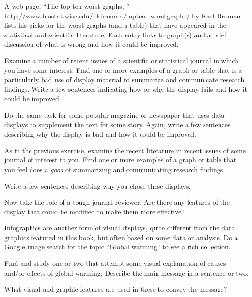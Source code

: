 
\begin{Exercises}

 \exercise A web page, ``The top ten worst graphs, '' \url{http://www.biostat.wisc.edu/~kbroman/topten_worstgraphs/} by Karl Broman lists his picks for the worst graphs (and a table) that have appeared in the
 statistical and scientific literature.  Each entry links to graph(s) and a brief discussion of
 what is wrong and how it could be improved. 
 \begin{enumerate*}
   \item Examine a number of recent issues of a scientific or statistical journal in which you
   have some interest.  Find one or more examples of a graph or table that is a particularly
   bad use of display material to summarize and communicate research findings. Write a
   few sentences indicating how or why the display fails and how it could be improved.
   \item Do the same task for some popular magazine or newspaper that uses data displays
   to supplement the text for some story. Again, write a few sentences describing why the
   display is bad and how it could be improved.
 \end{enumerate*}
 
 \exercise As in the previous exercise, examine the recent literature in recent issues of some
 journal of interest to you.  Find one or more examples of a graph or table that you feel
 does a \emph{good} of summarizing and communicating research findings.
 \begin{enumerate*}
   \item Write a few sentences describing why you chose these displays.
   \item Now take the role of a tough journal reviewer.  Are there any features of the
   display that could be modified to make them more effective?
 \end{enumerate*}
 
 \exercise Infographics are another form of visual displays, quite different from the
 data graphics featured in this book, but often based on some data or analysis.
 Do a Google image search for the topic ``Global warming'' to see a rich
 collection.
 \begin{enumerate*}
   \item Find and study one or two that attempt some visual explanation of causes
   and/or effects of global warming.  Describe the main message in a sentence or
   two.
   \item What visual and graphic features are used in these to convey the message?
 \end{enumerate*}


\end{Exercises}
